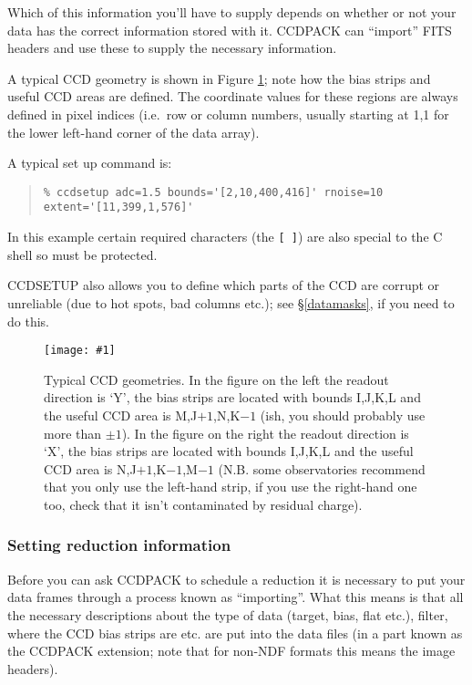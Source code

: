 \documentclass[twoside,11pt]{article}
\newcommand{\htmladdimg}[1]{}
\newcommand{\hyperref}[4]{#2\ref{#4}#3}
\newcommand{\htmlref}[2]{#1}
\newcommand{\latexhtml}[2]{#1}
\renewcommand{\_}{\texttt{\symbol{95}}}
\newcommand{\ttsize}{\latexhtml{\small}{}}
\newenvironment{myquote}{\begin{quote}\ttsize}{\end{quote}}
\newcommand{\text}[1]{{\ttsize \tt #1}}
\newcommand{\xroutine}[1]{\htmlref{{\sc #1}}{#1}}
\newcommand{\myfig} [5] {
  \begin{figure}
    \centering\texttt{[image: \#1]}
    \typeout{#1 inserted on page \arabic{page}}
    \caption{\label{#4}#5}
  \end{figure}
  }
\newcommand{\myfig}[5]{
    \htmladdimg{#3}\\
    Figure: \label{#4} #5
    }
\begin{document}
Which of this information you'll have to supply depends on whether or
not your data has the correct information stored with it.
CCDPACK can ``import'' FITS headers and use these to supply the
necessary information.

A typical CCD geometry is shown in Figure \ref{CCDPICCY}; note how the
bias strips and useful CCD areas are defined. The coordinate values
for these regions are always defined in pixel indices (i.e.\ row or
column numbers, usually starting at 1,1 for the lower left-hand corner
of the data array).

A typical set up command is:
\begin{myquote}
\begin{verbatim}
% ccdsetup adc=1.5 bounds='[2,10,400,416]' rnoise=10 extent='[11,399,1,576]'
\end{verbatim}
\end{myquote}
In this example certain required characters (the \text{[ ]}) are also
special to the C shell so must be protected.

\xroutine{CCDSETUP} also allows you to define which parts of the CCD are
corrupt or unreliable (due to hot spots, bad columns etc.); see
\hyperref{the section on data-masks}{\S}{}{datamasks}, if you need to do this.

\myfig{sun139geo.eps}{}{geo.gif}{CCDPICCY}{Typical CCD geometries.
In the figure on the left the readout direction is `Y', the bias
strips are located with bounds I,J,K,L and the useful CCD area is
M,J$+1$,N,K$-1$ (ish, you should probably use more than $\pm 1$).  In
the figure on the right the readout direction is `X', the bias strips
are located with bounds I,J,K,L and the useful CCD area is
N,J$+1$,K$-1$,M$-1$ (N.B. some observatories recommend that you only
use the left-hand strip, if you use the right-hand one too, check that
it isn't contaminated by residual charge).}

\subsubsection{Setting reduction information \label{settingreductioninfo}}

Before you can ask CCDPACK to schedule a reduction it is necessary to
put your data frames through a process known as ``importing''. What
this means is that all the necessary descriptions about the type of
data (target, bias, flat etc.), filter, where the CCD bias strips are
etc. are put into the data files (in a part known as the CCDPACK
extension; note that for non-NDF formats this means the image
headers).
\end{document}
